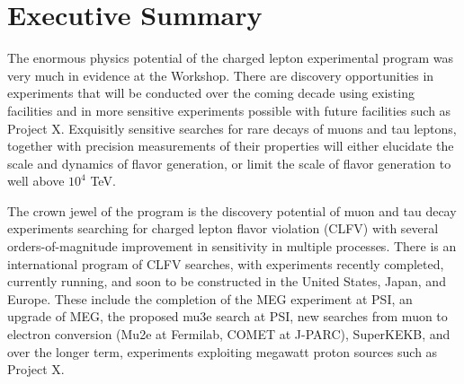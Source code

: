 \documentclass{tcibook}
\begin{document}
\def\bibname{References}


\raggedbottom


\parindent=0pt
\parskip=8pt
\setlength{\evensidemargin}{0pt}
\setlength{\oddsidemargin}{0pt}
\setlength{\marginparsep}{0.0in}
\setlength{\marginparwidth}{0.0in}
\marginparpush=0pt



\renewcommand{\chapname}{chap:intro_}
\renewcommand{\chapterdir}{.}
\renewcommand{\arraystretch}{1.25}
\addtolength{\arraycolsep}{-3pt}




\chapter{{Executive Summary}}
\bigskip\bigskip
The enormous physics potential of the charged
lepton experimental program was very much in evidence at the Workshop. There are discovery opportunities in experiments that will be conducted over the coming decade using existing facilities and in more sensitive experiments possible with future facilities such as Project X.
Exquisitly sensitive searches for rare decays of muons and tau leptons, together with precision measurements of their properties will either elucidate the scale and dynamics of flavor generation, or
limit the scale of flavor generation to well above $10^4$ TeV.  

The crown jewel of the program is the discovery potential of muon and tau decay experiments searching for charged lepton flavor violation (CLFV) with several orders-of-magnitude improvement in sensitivity in
multiple processes.  There is an
international program of CLFV searches, with experiments recently completed, currently running, and
soon to be constructed in the United States, Japan, and Europe.  These include the completion of the MEG experiment at PSI, an upgrade of MEG,  the proposed mu3e search at PSI, new searches from muon to electron conversion (Mu2e at Fermilab, COMET at J-PARC), SuperKEKB, and over the longer term, experiments exploiting megawatt proton sources such as Project X.
\end{document}
